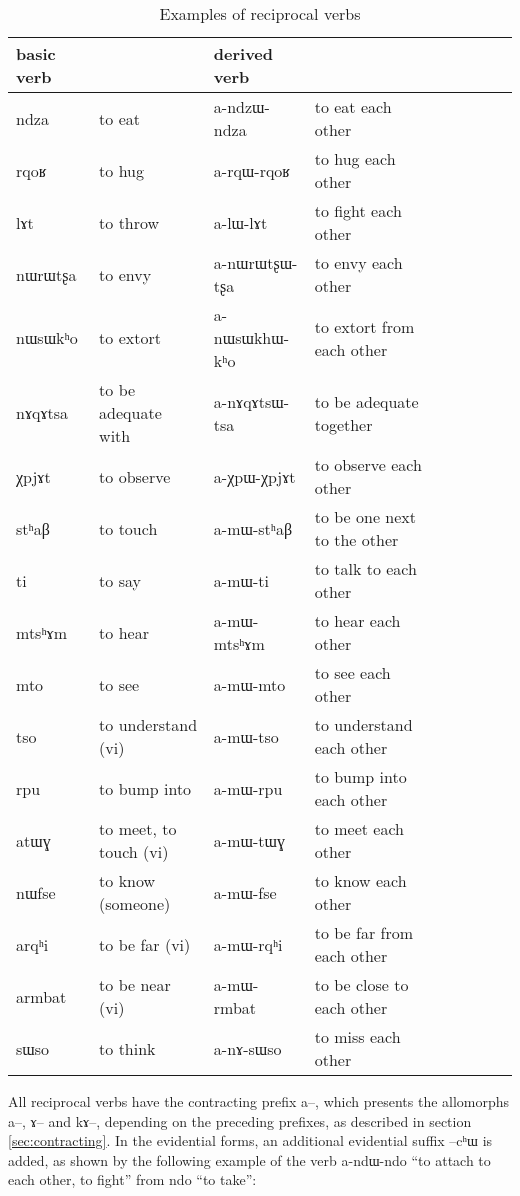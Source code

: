 \documentclass[oldfontcommands,oneside,a4paper,11pt]{memoir}
\newcommand{\ipa}[1]{{\phon #1}} %
\begin{document}
\begin{table}[H]
\caption{Examples of reciprocal verbs}\label{tab:reciprocal} \centering
\begin{tabular}{lllllllll} \toprule
basic verb  & &derived  verb &\\
\midrule
\ipa{ndza}   &	to eat&  	\ipa{a-ndzɯ-ndza}   &	 to eat each other \\  
\ipa{rqoʁ}   &	to hug&  	\ipa{a-rqɯ-rqoʁ}   &	 to hug each other \\  
\ipa{lɤt}   &	to throw&  	\ipa{a-lɯ-lɤt}   &	 to fight each other \\  
\ipa{nɯrɯtʂa}   &	to envy&  	\ipa{a-nɯrɯtʂɯ-tʂa}   &	 to envy each other \\  
\ipa{nɯsɯkʰo}   &	to extort  &  	\ipa{a-nɯsɯkhɯ-kʰo}   &	 to extort from each other \\  
\ipa{nɤqɤtsa}   &	to be adequate with  &  	\ipa{a-nɤqɤtsɯ-tsa}   &	 to be adequate together \\  
\ipa{χpjɤt}   &	to observe  &  	\ipa{a-χpɯ-χpjɤt}   &	 to observe each other \\  
 \midrule
 \ipa{stʰaβ}   &	to touch  &  	 \ipa{a-mɯ-stʰaβ}   &	to be one next to the other \\  
 \ipa{ti}   &	to say &  	 \ipa{a-mɯ-ti}   &	to  talk to each other\\ 
  \ipa{mtsʰɤm}   &	to hear &  	 \ipa{a-mɯ-mtsʰɤm}   &	to  hear each other \\ 
  \ipa{mto}   &	to  see&  	 \ipa{a-mɯ-mto}   &	to  see each other \\ 
  \ipa{tso}   &	to  understand (vi)&  	 \ipa{a-mɯ-tso}   &	to  understand each other \\ 
  \ipa{rpu}   &	to bump into &  	 \ipa{a-mɯ-rpu}   &	to  bump into each other \\ 
  \ipa{atɯɣ}   &	to  meet, to touch (vi)&  	 \ipa{a-mɯ-tɯɣ}   &	to  meet  each other \\ 
  \ipa{nɯfse}   &	to know (someone) &  	 \ipa{a-mɯ-fse}   &	to  know each other \\ 
  \ipa{arqʰi}   &	to be far (vi)&  	 \ipa{a-mɯ-rqʰi}   &	to  be far from each other \\ 
  \ipa{armbat}   &	to be near (vi)&  	 \ipa{a-mɯ-rmbat}   &	to  be close to each other \\ 
  \midrule
  \ipa{sɯso}   &	to think &  	 \ipa{a-nɤ-sɯso}   &	to miss each other \\ 
\bottomrule
\end{tabular}
\end{table}
All reciprocal verbs have the contracting prefix \ipa{a}--, which presents the allomorphs  \ipa{a}--,  \ipa{ɤ}-- and  \ipa{kɤ}--, depending on the preceding prefixes, as described in section \ref{sec:contracting}. In the evidential forms, an additional evidential suffix --\ipa{cʰɯ} is added, as shown by the following example of the verb \ipa{a-ndɯ-ndo} ``to attach to each other, to fight'' from \ipa{ndo} ``to take'':
\end{document}
